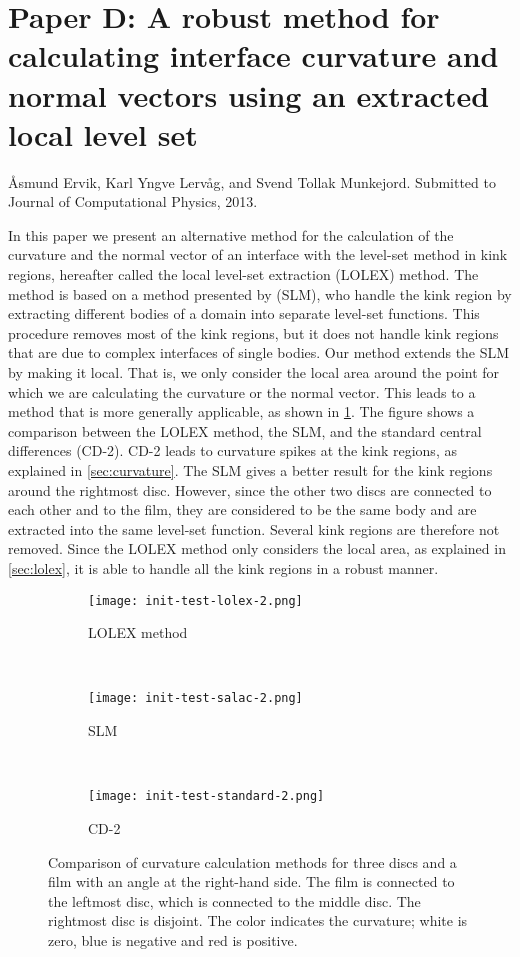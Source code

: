 \documentclass[11pt,b5paper,DIV=calc,BCOR1.3cm,headings=small,%
               footinclude=false,headsepline]{scrbook}
\begin{document}
\section[Paper D]{Paper D:  A robust method for calculating interface curvature
  and normal vectors using an extracted local level set}
Åsmund Ervik, Karl Yngve Lervåg, and Svend Tollak Munkejord.  Submitted to
Journal of Computational Physics, 2013.

In this paper we present an alternative method for the calculation of the
curvature and the normal vector of an interface with the level-set method in
kink regions, hereafter called the local level-set extraction (LOLEX) method.
The method is based on a method presented by \citet{Salac08} (SLM), who handle
the kink region by extracting different bodies of a domain into separate
level-set functions.  This procedure removes most of the kink regions, but it
does not handle kink regions that are due to complex interfaces of single
bodies.  Our method extends the SLM by making it local.  That is, we only
consider the local area around the point for which we are calculating the
curvature or the normal vector.  This leads to a method that is more generally
applicable, as shown in \cref{fig:D1}.  The figure shows a comparison between
the LOLEX method, the SLM, and the standard central differences (CD-2).  CD-2
leads to curvature spikes at the kink regions, as explained in
\cref{sec:curvature}.  The SLM gives a better result for the kink regions
around the rightmost disc.  However, since the other two discs are connected to
each other and to the film, they are considered to be the same body and are
extracted into the same level-set function.  Several kink regions are therefore
not removed.  Since the LOLEX method only considers the local area, as
explained in \cref{sec:lolex}, it is able to handle all the kink regions in
a robust manner.
\begin{figure}[tbp]
  \centering
  \begin{subfigure}[t]{\textwidth}
    \centering
    \texttt{[image: init-test-lolex-2.png]}
    \caption{LOLEX method}
  \end{subfigure} \\
  \begin{subfigure}[t]{\textwidth}
    \centering
    \texttt{[image: init-test-salac-2.png]}
    \caption{SLM}
  \end{subfigure} \\
  \begin{subfigure}[t]{\textwidth}
    \centering
    \texttt{[image: init-test-standard-2.png]}
    \caption{CD-2}
  \end{subfigure}
  \caption{Comparison of curvature calculation methods for three discs and
    a film with an angle at the right-hand side.  The film is connected to the
    leftmost disc, which is connected to the middle disc.  The rightmost disc
    is disjoint.  The color indicates the curvature; white is zero, blue is
    negative and red is positive.}
  \label{fig:D1}
\end{figure}
\end{document}
